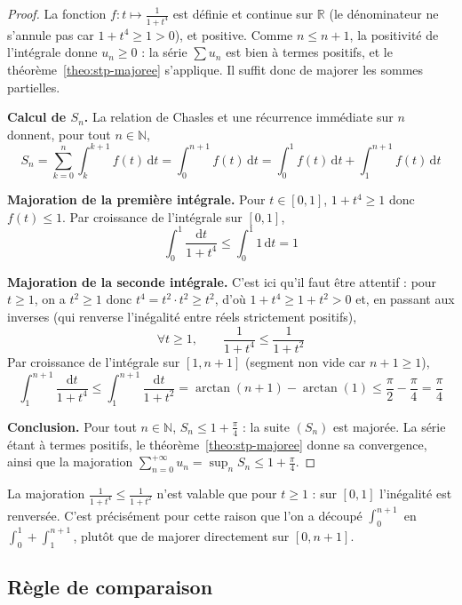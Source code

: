\begin{proof}
La fonction $f:t\mapsto\frac{1}{1+t^4}$ est définie et continue sur $\mathbb{R}$ (le dénominateur ne s'annule pas car $1+t^4\geq 1>0$), et positive. Comme $n\leq n+1$, la positivité de l'intégrale donne $u_n\geq 0$ : la série $\sum u_n$ est bien à termes positifs, et le théorème~\ref{theo:stp-majoree} s'applique. Il suffit donc de majorer les sommes partielles.

\textbf{Calcul de $S_n$.} La relation de Chasles et une récurrence immédiate sur $n$ donnent, pour tout $n\in\mathbb{N}$,
\[S_n = \sum_{k=0}^{n}\int_{k}^{k+1} f(t)\,\mathrm{d}t = \int_{0}^{n+1} f(t)\,\mathrm{d}t = \int_{0}^{1}f(t)\,\mathrm{d}t + \int_{1}^{n+1}f(t)\,\mathrm{d}t\]

\textbf{Majoration de la première intégrale.} Pour $t\in[0,1]$, $1+t^4\geq 1$ donc $f(t)\leq 1$. Par croissance de l'intégrale sur $[0,1]$,
\[\int_{0}^{1}\frac{\mathrm{d}t}{1+t^4} \leq \int_{0}^{1}1\,\mathrm{d}t = 1\]

\textbf{Majoration de la seconde intégrale.} C'est ici qu'il faut être attentif : pour $t\geq 1$, on a $t^2\geq 1$ donc $t^4=t^2\cdot t^2\geq t^2$, d'où $1+t^4\geq 1+t^2>0$ et, en passant aux inverses (qui renverse l'inégalité entre réels strictement positifs),
\[\forall t\geq 1,\qquad \frac{1}{1+t^4}\leq\frac{1}{1+t^2}\]
Par croissance de l'intégrale sur $[1,n+1]$ (segment non vide car $n+1\geq 1$),
\[\int_{1}^{n+1}\frac{\mathrm{d}t}{1+t^4} \leq \int_{1}^{n+1}\frac{\mathrm{d}t}{1+t^2} = \arctan(n+1)-\arctan(1) \leq \frac{\pi}{2}-\frac{\pi}{4} = \frac{\pi}{4}\]

\textbf{Conclusion.} Pour tout $n\in\mathbb{N}$, $S_n\leq 1+\frac{\pi}{4}$ : la suite $(S_n)$ est majorée. La série étant à termes positifs, le théorème~\ref{theo:stp-majoree} donne sa convergence, ainsi que la majoration $\sum_{n=0}^{+\infty}u_n=\sup_n S_n\leq 1+\frac{\pi}{4}$.
\end{proof}

\begin{remarque}
La majoration $\frac{1}{1+t^4}\leq\frac{1}{1+t^2}$ n'est valable que pour $t\geq 1$ : sur $[0,1]$ l'inégalité est renversée. C'est précisément pour cette raison que l'on a découpé $\int_0^{n+1}$ en $\int_0^1+\int_1^{n+1}$, plutôt que de majorer directement sur $[0,n+1]$.
\end{remarque}

\subsection{Règle de comparaison}


